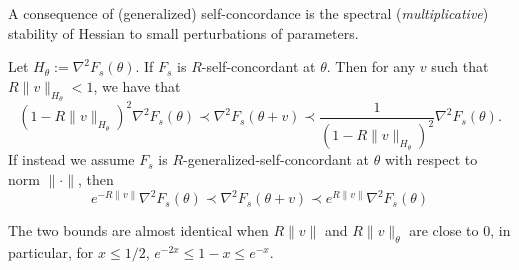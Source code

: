 


A consequence of (generalized) self-concordance is the spectral (\emph{multiplicative}) stability of Hessian to small perturbations of parameters.
\begin{lemma}\label{lem:selfconcordant-hessian}
	Let $H_\theta :=  \nabla^2F_s(\theta)$. If $F_s$ is $R$-self-concordant at $\theta$. Then for any $v$ such that $R \|v\|_{H_\theta} < 1$, we have that
	$$
	(1-R\|v\|_{H_\theta})^2 \nabla^2 F_s(\theta) 	\prec	\nabla^2 F_s(\theta+v) \prec  \frac{1}{(1-R\|v\|_{H_\theta})^2}   \nabla^2 F_s(\theta)  .
	$$
	If instead we assume $F_s$ is $R$-generalized-self-concordant at $\theta$ with respect to norm $\|\cdot\|$, then
	$$
	e^{-R\|v\|} \nabla^2 F_s(\theta) \prec  \nabla^2 F_s(\theta+v)  \prec e^{R\|v\|}  \nabla^2 F_s(\theta) 
	$$
\end{lemma}\label{stability}
The two bounds are almost identical when  $R\|v\|$ and $R\|v\|_{\theta}$ are close to $0$, in particular, for $x\leq 1/2$, $e^{-2x} \leq 1-x \leq e^{-x}$.